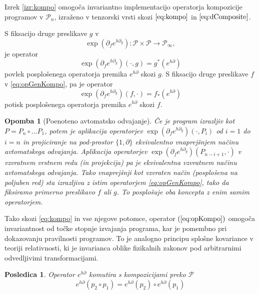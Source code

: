 \documentclass[a4paper, 12pt]{book}
\newcommand{\ed}{e^{h\partial}}
\newcommand{\dP}{\mathcal{P}}
\newcommand{\D}{\partial}
\newtheorem{posledica}{Posledica}[chapter]
\newtheorem{opomba}{Opomba}[chapter]
\begin{document}
 
 Izrek \ref{izr:kompo} omogoča invariantno implementacijo operatorja kompozicije programov v $\dP_n$, izraženo v tenzorski vrsti skozi $\eqref{eq:kompo}$ in $\eqref{eq:dComposite}$.
 
  S fiksacijo druge preslikave $g$ v  
   \begin{equation}\label{eq:opGenKompo}
  \exp(\D_fe^{h\D_g}): \dP\times\dP\to\dP_\infty,
   \end{equation}
   je operator
   \begin{equation}
    \exp(\D_fe^{h\D_g})(\cdot,g)=g^*\left( e^{h\D} \right)\label{eq:opKompo}
  \end{equation}
  povlek posplošenega operatorja premika $\ed$ skozi $g$. S fiksacijo druge preslikave $f$ v \eqref{eq:opGenKompo}, pa je operator
    \begin{equation}
   \exp(\D_fe^{h\D_g})(f,\cdot)=f_*\left( e^{h\D} \right)\label{eq:opKompoForward}
   \end{equation}
potisk posplošenega operatorja premika $\ed$ skozi $f$.

\begin{opomba}[Poenoteno avtomatsko odvajanje]
\label{trd:reverseForward}
Če je program izrazljiv kot $P=P_n\circ\ldots P_1$, potem je aplikacija operatorjev
  $\exp(\D_fe^{h\D_g})(\cdot,P_i)$ od $i=1$ do $i=n$ in projiciranje na pod-prostor $\{1,\D\}$ ekvivalentno vnaprejšnjem načinu avtomatskega odvajanja.
  Aplikacija operatorjev $\exp(\D_fe^{h\D_g})(P_{n-i+1},\cdot)$ v vzvratnem vrstnem redu (in projekcija) pa je ekvivalentna vzvratnem načinu  avtomatskega odvajanja.
  Tako vnaprejšnji kot vzvraten način (posplošena na poljuben red)
  sta izrazljiva z istim operatorjem \eqref{eq:opGenKompo}, tako da fiksiramo primerno preslikavo $f$ ali $g$. To posplošuje oba koncepta z enim samim operatorjem.
\end{opomba}

Tako skozi \eqref{eq:kompo} in vse njegove potomce, operator $(\ref{eq:opKompo})$ omogoča invariantnost od točke stopnje izvajanja programa, kar je pomembno pri dokazovanju pravilnosti programov. To je analogno principu splošne kovariance \cite{GeneralCovariance} v teoriji relativnosti, ki je invarianca oblike fizikalnih zakonov pod arbitrarnimi odvedljivimi transformacijami.

\begin{posledica}\label{izr:komp_homo}
   Operator $e^{h\D}$ komutira s kompozicijami preko $\dP$
   \begin{equation*}
   e^{h\D}(p_2\circ p_1)=e^{h\D}(p_2)\circ e^{h\D}(p_1)
   \end{equation*}
   \end{posledica}
   
\end{document}
